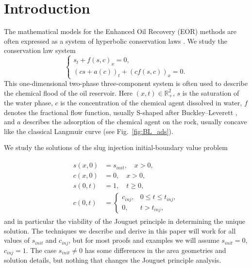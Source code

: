 \documentclass[12pt]{article}
\theoremstyle{definition}
\begin{document}
\section{Introduction}
The mathematical models for the Enhanced Oil Recovery (EOR) methods are often expressed as a system of hyperbolic conservation laws \cite{Gelfand, Dafermos}.
We study the conservation law system
\begin{equation}\label{eq:main_system_chem_flood}
\begin{cases} 
s_t + f(s, c)_x = 0, \\
(cs + a(c))_t + (cf(s,c))_x  = 0.
\end{cases}
\end{equation}
This one-dimensional two-phase three-component system is often used to describe the chemical flood of the oil reservoir. Here $(x,t)\in\mathbb{R}_+^2$, $s$ is the saturation of the water phase, $c$ is the concentration of the chemical agent dissolved in water, $f$ denotes the fractional flow function, usually S-shaped after Buckley--Leverett \cite{BL}, and $a$ describes the adsorption of the chemical agent on the rock, usually concave like the classical Langmuir curve (see Fig.~\ref{fig:BL_ads}).

We study the solutions of the slug injection initial-boundary value problem


\begin{align}
\label{eq:Initial_boundary_problem}
\begin{split}
s(x,0) &= s_{init}, \quad x > 0,\\
c(x,0) &= 0, \quad x > 0,\\
s(0,t) &= 1, \quad t \geqslant 0, \\
c(0,t) &= \begin{cases}
    c_{inj}, & 0 \leqslant t \leqslant t_{inj}, \\
    0, & t > t_{inj},
\end{cases}
\end{split}
\end{align}
and in particular the viability of the Jouguet principle in determining the unique solution. The techniques we describe and derive in this paper will work for all values of $s_{init}$ and $c_{inj}$, but for most proofs and examples we will assume $s_{init} = 0$, $c_{inj} = 1$. The case $s_{init} \neq 0$ has some differences in the area geometries and solution details, but nothing that changes the Jouguet principle analysis.
\end{document}
